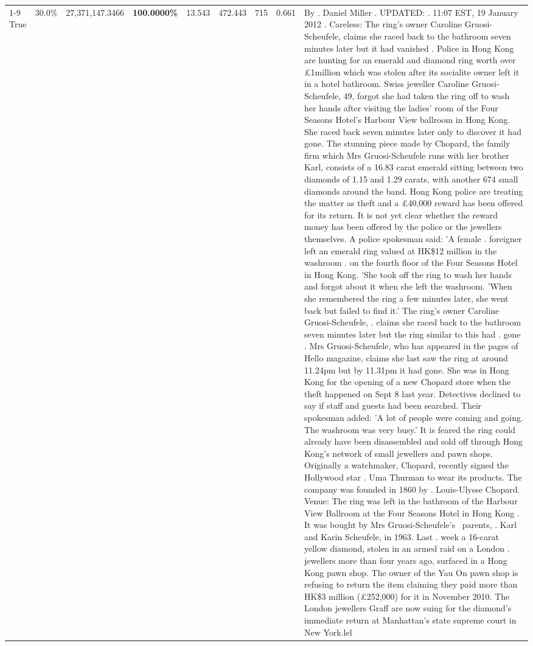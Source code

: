 \begin{table}[H]
\begin{tabular}{lllrlllll}
\cline{1-9}
True & 30.0\% & 27,371,147.3466 & \bfseries \color{red} 100.0000\% & 13.543 & 472.443 & 715 & 0.661 & By . Daniel Miller . UPDATED: . 11:07 EST, 19 January 2012 . Careless: The ring's owner Caroline Gruosi-Scheufele, claims she raced back to the bathroom seven minutes later but it had vanished . Police in Hong Kong are hunting for an emerald and diamond ring worth over £1million which was stolen after its socialite owner left it in a hotel bathroom. Swiss jeweller Caroline Gruosi-Scheufele, 49, forgot she had taken the ring off to wash her hands after visiting the ladies' room of the Four Seasons Hotel's Harbour View ballroom in Hong Kong. She raced back seven minutes later only to discover it had gone. The stunning piece made by Chopard, the family firm which Mrs Gruosi-Scheufele runs with her brother Karl, consists of a 16.83 carat emerald sitting between two diamonds of 1.15 and 1.29 carats, with another 674 small diamonds around the band. Hong Kong police are treating the matter as theft and a £40,000 reward has been offered for its return. It is not yet clear whether the reward money has been offered by the police or the jewellers themselves. A police spokesman said: 'A female . foreigner left an emerald ring valued at HK\$12 million in the washroom . on the fourth floor of the Four Seasons Hotel in Hong Kong. 'She took off the ring to wash her hands and forgot about it when she left the washroom. 'When she remembered the ring a few minutes later, she went back but failed to find it.' The ring's owner Caroline Gruosi-Scheufele, . claims she raced back to the bathroom seven minutes later but the ring similar to this had . gone . Mrs Gruosi-Scheufele, who has appeared in the pages of Hello magazine, claims she last saw the ring at around 11.24pm but by 11.31pm it had gone. She was in Hong Kong for the opening of a new Chopard store when the theft happened on Sept 8 last year. Detectives declined to say if staff and guests had been searched. Their spokesman added: 'A lot of people were coming and going. The washroom was very busy.' It is feared the ring could already have been disassembled and sold off through Hong Kong's network of small jewellers and pawn shops. Originally a watchmaker, Chopard, recently signed the Hollywood star . Uma Thurman to wear its products. The company was founded in 1860 by . Louis-Ulysse Chopard. Venue: The ring was left in the bathroom of the Harbour View Ballroom at the Four Seasons Hotel in Hong Kong . It was bought by Mrs Gruosi-Scheufele's  parents, . Karl and Karin Scheufele, in 1963. Last . week a 16-carat yellow diamond, stolen in an armed raid on a London . jewellers more than four years ago, surfaced in a Hong Kong pawn shop. The owner of the Yau On pawn shop is refusing to return the item claiming they paid more than HK\$3 million (£252,000) for it in November 2010. The London jewellers Graff are now suing for the diamond’s immediate return at Manhattan’s state supreme court in New York.lel \\

\end{tabular}
\end{table}
